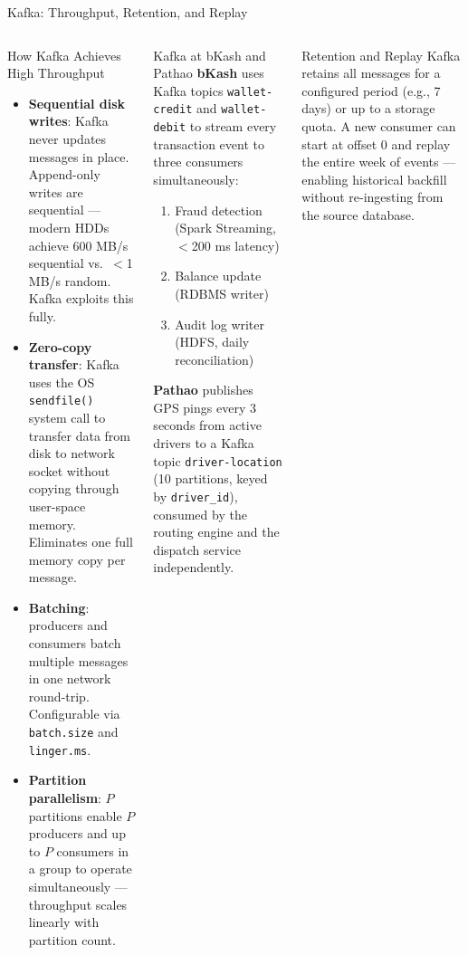 \documentclass[aspectratio=169,10pt]{beamer}
\begin{document}
\begin{frame}{Kafka: Throughput, Retention, and Replay}
  \begin{columns}[T]
      \begin{block}{How Kafka Achieves High Throughput}
        \begin{itemize}
          \item \textbf{Sequential disk writes}: Kafka never updates messages in place.  Append-only writes are sequential — modern HDDs achieve 600 MB/s sequential vs.\ $<$1 MB/s random.  Kafka exploits this fully.
          \item \textbf{Zero-copy transfer}: Kafka uses the OS \texttt{sendfile()} system call to transfer data from disk to network socket without copying through user-space memory.  Eliminates one full memory copy per message.
          \item \textbf{Batching}: producers and consumers batch multiple messages in one network round-trip.  Configurable via \texttt{batch.size} and \texttt{linger.ms}.
          \item \textbf{Partition parallelism}: $P$ partitions enable $P$ producers and up to $P$ consumers in a group to operate simultaneously — throughput scales linearly with partition count.
        \end{itemize}
      \end{block}

      \begin{exampleblock}{Kafka at bKash and Pathao}
        \small \textbf{bKash} uses Kafka topics \texttt{wallet-credit} and \texttt{wallet-debit} to stream every transaction event to three consumers simultaneously:
        \begin{enumerate}
          \item Fraud detection (Spark Streaming, $<$200 ms latency)
          \item Balance update (RDBMS writer)
          \item Audit log writer (HDFS, daily reconciliation)
        \end{enumerate}
        \vspace{4pt}
        \textbf{Pathao} publishes GPS pings every 3 seconds from active drivers to a Kafka topic \texttt{driver-location} (10 partitions, keyed by \texttt{driver\_id}), consumed by the routing engine and the dispatch service independently.
      \end{exampleblock}
      \vspace{4pt}
      \begin{alertblock}{Retention and Replay}
        \small Kafka retains all messages for a configured period (e.g., 7 days) or up to a storage quota.  A new consumer can start at offset 0 and replay the entire week of events --- enabling historical backfill without re-ingesting from the source database.
      \end{alertblock}
  \end{columns}
\end{frame}
\end{document}
